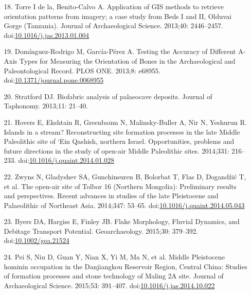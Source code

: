 \documentclass[]{article}
\begin{document}
\hypertarget{ref-de_la_torre_application_2013}{}
18. Torre I de la, Benito-Calvo A. Application of GIS methods to
retrieve orientation patterns from imagery; a case study from Beds I and
II, Olduvai Gorge (Tanzania). Journal of Archaeological Science.
2013;40: 2446--2457.
doi:\href{https://doi.org/10.1016/j.jas.2013.01.004}{10.1016/j.jas.2013.01.004}

\hypertarget{ref-dominguez-rodrigo_testing_2013}{}
19. Domínguez-Rodrigo M, García-Pérez A. Testing the Accuracy of
Different A-Axis Types for Measuring the Orientation of Bones in the
Archaeological and Paleontological Record. PLOS ONE. 2013;8: e68955.
doi:\href{https://doi.org/10.1371/journal.pone.0068955}{10.1371/journal.pone.0068955}

\hypertarget{ref-stratford_biofabric_2013}{}
20. Stratford DJ. Biofabric analysis of palaeocave deposits. Journal of
Taphonomy. 2013;11: 21--40.

\hypertarget{ref-hovers_islands_2014}{}
21. Hovers E, Ekshtain R, Greenbaum N, Malinsky-Buller A, Nir N,
Yeshurun R. Islands in a stream? Reconstructing site formation processes
in the late Middle Paleolithic site of `Ein Qashish, northern Israel.
Opportunities, problems and future directions in the study of open-air
Middle Paleolithic sites. 2014;331: 216--233.
doi:\href{https://doi.org/10.1016/j.quaint.2014.01.028}{10.1016/j.quaint.2014.01.028}

\hypertarget{ref-zwyns_open-air_2014}{}
22. Zwyns N, Gladyshev SA, Gunchinsuren B, Bolorbat T, Flas D, Dogandžić
T, et al. The open-air site of Tolbor 16 (Northern Mongolia):
Preliminary results and perspectives. Recent advances in studies of the
late Pleistocene and Palaeolithic of Northeast Asia. 2014;347: 53--65.
doi:\href{https://doi.org/10.1016/j.quaint.2014.05.043}{10.1016/j.quaint.2014.05.043}

\hypertarget{ref-byers_flake_2015}{}
23. Byers DA, Hargiss E, Finley JB. Flake Morphology, Fluvial Dynamics,
and Debitage Transport Potential. Geoarchaeology. 2015;30: 379--392.
doi:\href{https://doi.org/10.1002/gea.21524}{10.1002/gea.21524}

\hypertarget{ref-pei_middle_2015}{}
24. Pei S, Niu D, Guan Y, Nian X, Yi M, Ma N, et al. Middle Pleistocene
hominin occupation in the Danjiangkou Reservoir Region, Central China:
Studies of formation processes and stone technology of Maling 2A site.
Journal of Archaeological Science. 2015;53: 391--407.
doi:\href{https://doi.org/10.1016/j.jas.2014.10.022}{10.1016/j.jas.2014.10.022}
\end{document}
